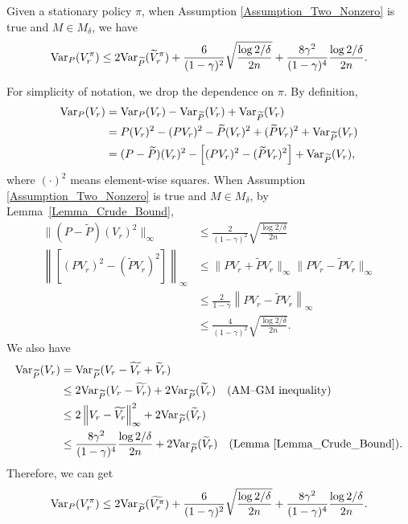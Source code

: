 \begin{lemma}\label{Lemma_Bound_Variance}
Given a stationary policy $\pi$, when Assumption \ref{Assumption_Two_Nonzero} is true and $M\in M_\delta$, we have
$$\mathrm{Var}_{P}(V_r^\pi)\leq 2\mathrm{Var}_{\widetilde P}(\widetilde{V}_r^\pi) + \frac{6}{(1-\gamma)^2}\sqrt{\frac{\log 2/\delta}{2n}}+\frac{8\gamma^2}{(1-\gamma)^4}\frac{\log 2/\delta}{2n}.
$$
\end{lemma}
For simplicity of notation, we drop the dependence on $\pi$.
By definition,
$$\begin{aligned}
\mathrm{Var}_P(V_r) &= \mathrm{Var}_P(V_r)-\mathrm{Var}_{\widetilde P}(V_r)+\mathrm{Var}_{\widetilde P}(V_r)\\
&= P(V_r)^2-(PV_r)^2-\widetilde P(V_r)^2 + (\widetilde P V_r)^2+\mathrm{Var}_{\widetilde P}(V_r)\\
&=(P-\widetilde P)(V_r)^2-\left[(PV_r)^2-(\widetilde PV_r)^2\right]+\mathrm{Var}_{\widetilde P}(V_r),
\end{aligned}
$$
where $(\cdot)^2$ means element-wise squares.
When Assumption \ref{Assumption_Two_Nonzero} is true and $M\in M_\delta$, by Lemma~\ref{Lemma_Crude_Bound},
$$
\begin{aligned}
\|(P-\widetilde P)(V_r)^2\|_\infty&\leq \frac{2}{(1-\gamma)^2}\sqrt{\frac{\log 2/\delta}{2n}}\\
\left\|\left[(PV_r)^2-(\widetilde PV_r)^2\right]\right\|_\infty&\leq \|PV_r +\widetilde PV_r\|_\infty\|PV_r -\widetilde PV_r\|_\infty\\
&\leq \frac{2}{1-\gamma}\left\|PV_r -\widetilde PV_r\right\|_\infty\\
&\leq \frac{4}{(1-\gamma)^2}\sqrt{\frac{\log 2/\delta}{2n}}.
\end{aligned}
$$
We also have
$$
\begin{aligned}
\mathrm{Var}_{\widetilde P}(V_r)&=\mathrm{Var}_{\widetilde P}(V_r-\widetilde{V_r}+\widetilde V_r)\\
&\leq 2\mathrm{Var}_{\widetilde P}(V_r-\widetilde{V_r}) + 2\mathrm{Var}_{\widetilde P} (\widetilde V_r)\quad \text{(AM–GM inequality)}\\
&\leq 2\left\|V_r-\widetilde{V_r}\right\|_\infty^2+2\mathrm{Var}_{\widetilde P} (\widetilde V_r)\\
&\leq \frac{8\gamma^2}{(1-\gamma)^4}\frac{\log 2/\delta}{2n}+2\mathrm{Var}_{\widetilde P} (\widetilde V_r)\quad \text{(Lemma \ref{Lemma_Crude_Bound})}.
\end{aligned}
$$
Therefore, we can get
$$\mathrm{Var}_{P}(V_r^\pi)\leq 2\mathrm{Var}_{\widetilde P}(\widetilde{V_r^\pi}) + \frac{6}{(1-\gamma)^2}\sqrt{\frac{\log 2/\delta}{2n}}+\frac{8\gamma^2}{(1-\gamma)^4}\frac{\log 2/\delta}{2n}.
$$
\endproof

